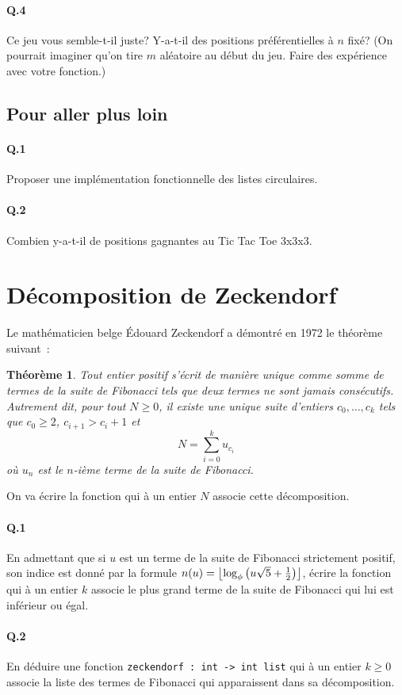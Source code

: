 \documentclass[10pt,a4paper]{article}
\DeclarePairedDelimiter\floor{\lfloor}{\rfloor}
\newtheorem{The}{Théorème}
\begin{document}
\paragraph{Q.4} Ce jeu vous semble-t-il juste? Y-a-t-il des positions préférentielles à $n$ fixé? (On pourrait imaginer qu'on tire $m$ aléatoire au début du jeu. Faire des expérience avec votre fonction.)

\subsection{Pour aller plus loin}
\paragraph{Q.1}Proposer une implémentation fonctionnelle des listes circulaires.
\paragraph{Q.2}Combien y-a-t-il de positions gagnantes au Tic Tac Toe
3x3x3. 

\section{Décomposition de Zeckendorf}
Le mathématicien belge Édouard Zeckendorf a démontré en 1972 le théorème suivant~:
\begin{The} Tout entier positif s'écrit de manière unique comme somme de termes de la suite de Fibonacci tels que deux termes ne sont jamais consécutifs. Autrement dit, pour tout $N \geq 0$, il existe une unique suite d'entiers  $c_0,\dots ,c_k$ tels que $c_0 \geq 2$, $c_{i+1} > c_i + 1$ et
\[N = \sum_{i=0}^{k} u_{c_i} \]
où $u_n$ est le $n$-ième terme de la suite de Fibonacci.
\end{The}
On va écrire la fonction qui à un entier $N$ associe cette décomposition.

\paragraph{Q.1} En admettant que si $u$ est un terme de la suite de Fibonacci strictement positif, son indice est donné par la formule $n(u)=\floor*{\log _{\phi} \left( u \sqrt{5} + \frac12 \right)}$, écrire la fonction qui à un entier $k$ associe le plus grand terme de la suite de Fibonacci qui lui est inférieur ou égal.

\paragraph{Q.2} En déduire une fonction \texttt{zeckendorf : int -> int list} qui à un entier $k \geq 0$ associe la liste des termes de Fibonacci qui apparaissent dans sa décomposition.
\end{document}
